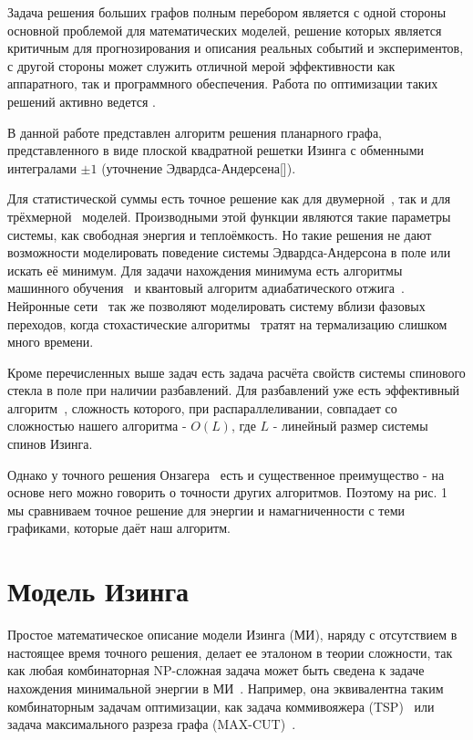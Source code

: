 \documentclass[10pt]{article}
\begin{document}
	Задача решения больших графов полным перебором является с одной стороны основной проблемой для математических моделей, решение которых является критичным для прогнозирования и описания реальных событий и экспериментов, с другой стороны может служить отличной мерой эффективности как аппаратного, так и программного обеспечения. Работа по оптимизации таких решений активно ведется \cite{romero2020high}. 
	
	В данной работе представлен алгоритм решения планарного графа, представленного в виде плоской квадратной решетки Изинга с обменными интегралами $\pm 1$ (уточнение Эдвардса-Андерсена[]). 
	
	Для статистической суммы есть точное решение как для двумерной~\cite{onsager1944crystal}, так и для трёхмерной~\cite{zhang2023exact} моделей. Производными этой функции являются такие параметры системы, как свободная энергия и теплоёмкость. Но такие решения не дают возможности моделировать поведение системы Эдвардса-Андерсона в поле или искать её минимум. Для задачи нахождения минимума есть алгоритмы машинного обучения~\cite{maren1991logical} и квантовый алгоритм адиабатического отжига~\cite{grant2020adiabatic}. Нейронные сети~\cite{Korol2021} так же позволяют моделировать систему вблизи фазовых переходов, когда стохастические алгоритмы~\cite{janke2008monte} тратят на термализацию слишком много времени.
	
	Кроме перечисленных выше задач есть задача расчёта свойств системы спинового стекла в поле при наличии разбавлений. Для разбавлений уже есть эффективный алгоритм~\cite{loh2006efficient}, сложность которого, при распараллеливании, совпадает со сложностью нашего алгоритма - $O(L)$, где $L$ - линейный размер системы спинов Изинга.
	
	Однако у точного решения Онзагера~\cite{onsager1944crystal} есть и существенное преимущество - на основе него можно говорить о точности других алгоритмов. Поэтому на рис. 1 мы сравниваем точное решение для энергии и намагниченности с теми графиками, которые даёт наш алгоритм.
	
	\section{Модель Изинга}
	Простое математическое описание модели Изинга (МИ), наряду с отсутствием в настоящее время точного решения, делает ее эталоном в теории сложности, так как любая комбинаторная NP-сложная задача может быть сведена к задаче нахождения минимальной энергии в МИ~\cite{Markovich2019}. Например, она эквивалентна таким комбинаторным задачам оптимизации, как задача коммивояжера (TSP)~\cite{papadimitriou1977euclidean} или задача максимального разреза графа ({}MAX-CUT)~\cite{karp2010reducibility}.
	
\end{document}
